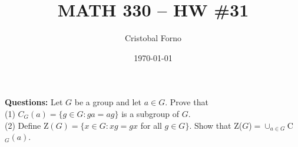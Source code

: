 \documentclass[12pt]{article}
\title{MATH 330 -- HW \#31}
\author{Cristobal Forno}
\date{\today}
\begin{document}
\maketitle

\textbf{Questions:} Let $G$ be a group and let $a \in G$. Prove that\\
(1) $C_{G}(a) = \{g \in G : ga = ag\}$ is a subgroup of $G$.\\
(2) Define Z$(G) = \{x \in G:xg = gx $ for all $g \in G\}$. Show that Z($G$)$=
\cup_{a \in G}$C$_{G}(a)$.
\end{document}
